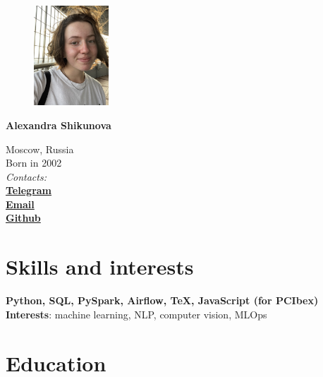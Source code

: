 \documentclass[11pt]{article} %
\begin{document}

\begin{figure} %
    \centering
    \includegraphics[width=0.25\textwidth]{photo}
\end{figure}
{\LARGE\bfseries Alexandra Shikunova} %
\bigskip\bigskip\medskip %

Moscow, Russia\\
Born in 2002\\

\textit{Contacts:}\\
\textbf{\href{https://t.me/thnlgrlivrlvdwsbrnwthrssnhrys}{Telegram}}\\
\textbf{\href{mailto:notalexandrashikunova@gmail.com}{Email}}\\
\textbf{\href{https://github.com/poisongrapevine}{Github}}
\medskip %


\section*{Skills and interests}

\textbf{Python, SQL, PySpark, Airflow, TeX, JavaScript (for PCIbex)}\\
\textbf{Interests}: machine learning, NLP, computer vision, MLOps


\section*{Education}
\end{document}

